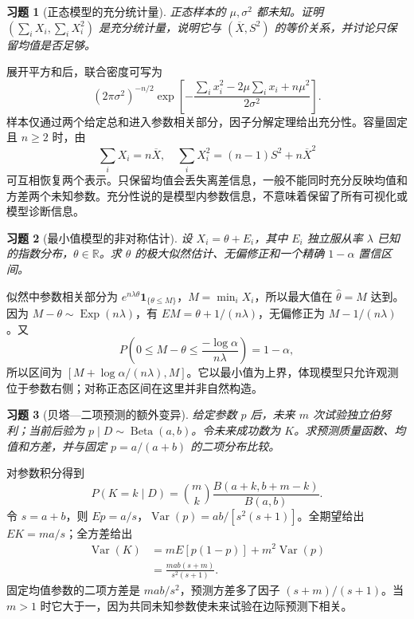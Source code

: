 \documentclass[UTF8,12pt,a4paper,fontset=fandol]{ctexart}
\newtheorem{exercise}{习题}[section]
\begin{document}
\begin{exercise}[正态模型的充分统计量]\label{q:B17.12}
正态样本的 $\mu,\sigma^2$ 都未知。证明 $(\sum_iX_i,\sum_iX_i^2)$ 是充分统计量，说明它与 $(\overline X,S^2)$ 的等价关系，并讨论只保留均值是否足够。\par{}
\end{exercise}

\begin{solve}\label{a:B17.12}展开平方和后，联合密度可写为\[(2\pi\sigma^2)^{-n/2}\exp\left[-\frac{\sum_i x_i^2-2\mu\sum_i x_i+n\mu^2}{2\sigma^2}\right].\]样本仅通过两个给定总和进入参数相关部分，因子分解定理给出充分性。容量固定且 $n\ge2$ 时，由\[\sum_iX_i=n\overline X,\quad\sum_iX_i^2=(n-1)S^2+n\overline X^2\]可互相恢复两个表示。只保留均值会丢失离差信息，一般不能同时充分反映均值和方差两个未知参数。充分性说的是模型内参数信息，不意味着保留了所有可视化或模型诊断信息。\end{solve}

\begin{exercise}[最小值模型的非对称估计]\label{q:B17.13}
设 $X_i=\theta+E_i$，其中 $E_i$ 独立服从率 $\lambda$ 已知的指数分布，$\theta\in\mathbb R$。求 $\theta$ 的极大似然估计、无偏修正和一个精确 $1-\alpha$ 置信区间。\par{}
\end{exercise}

\begin{solve}\label{a:B17.13}似然中参数相关部分为 $e^{n\lambda\theta}\mathbf1_{\{\theta\le M\}}$，$M=\min_iX_i$，所以最大值在 $\widehat\theta=M$ 达到。因为 $M-\theta\sim\operatorname{Exp}(n\lambda)$，有 $EM=\theta+1/(n\lambda)$，无偏修正为 $M-1/(n\lambda)$。又\[P\left(0\le M-\theta\le\frac{-\log\alpha}{n\lambda}\right)=1-\alpha,\]所以区间为 $[M+\log\alpha/(n\lambda),M]$。它以最小值为上界，体现模型只允许观测位于参数右侧；对称正态区间在这里并非自然构造。\end{solve}

\begin{exercise}[贝塔—二项预测的额外变异]\label{q:B17.14}
给定参数 $p$ 后，未来 $m$ 次试验独立伯努利；当前后验为 $p\mid D\sim\operatorname{Beta}(a,b)$。令未来成功数为 $K$。求预测质量函数、均值和方差，并与固定 $p=a/(a+b)$ 的二项分布比较。\par{}
\end{exercise}

\begin{solve}\label{a:B17.14}对参数积分得到\[P(K=k\mid D)=\binom mk\frac{B(a+k,b+m-k)}{B(a,b)}.\]令 $s=a+b$，则 $Ep=a/s$，$\operatorname{Var}(p)=ab/[s^2(s+1)]$。全期望给出 $EK=ma/s$；全方差给出\[\begin{aligned}\operatorname{Var}(K)&=mE[p(1-p)]+m^2\operatorname{Var}(p)\\&=\frac{mab(s+m)}{s^2(s+1)}.\end{aligned}\]固定均值参数的二项方差是 $mab/s^2$，预测方差多了因子 $(s+m)/(s+1)$。当 $m>1$ 时它大于一，因为共同未知参数使未来试验在边际预测下相关。\end{solve}
\end{document}

